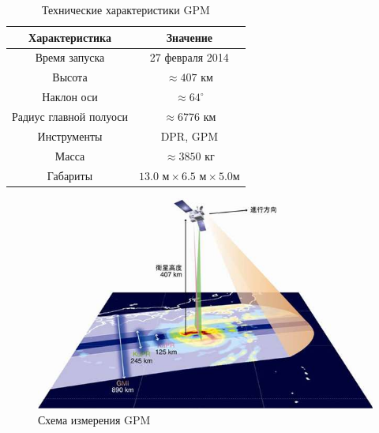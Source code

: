 
\begin{table}[H]
    \centering
    \begin{tabular}{|c|c|}
        \hline
        Характеристика & Значение\\
        \hline
        Время запуска & 27 февраля 2014 \\
        Высота & $\approx 407$ км\\
        Наклон оси & $\approx 64^{\circ}$ \\
        Радиус главной полуоси & $\approx 6776 \text{ км}$ \\
        Инструменты & DPR, GPM \\
        Масса & $\approx 3850$ кг \\
        Габариты &  $13.0 \text{ м} \times 6.5 \text{ м} \times 5.0 \text{
        м}$\\
        \hline
    \end{tabular}
    \caption{Технические характеристики GPM}
    \label{tab:GPM}
\end{table}

\begin{figure}[h]
    \centering
    \includegraphics[width=0.6\linewidth]{figs/gpm.png}
    \caption{Схема измерения GPM}
    \label{fig:GPM}
\end{figure}




